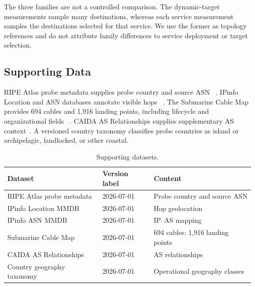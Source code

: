 The three families are not a controlled comparison. The dynamic-target
measurements sample many destinations, whereas each service measurement
samples the destinations selected for that service. We use the former as
topology references and do not attribute family differences to service
deployment or target selection.

\subsection{Supporting Data}

RIPE Atlas probe metadata supplies probe country and source ASN
~\cite{ripe_atlas}. IPinfo Location and ASN databases annotate visible hops
~\cite{ipinfo}. The Submarine Cable Map provides 694 cables and 1,916 landing
points, including lifecycle and organizational fields
~\cite{telegeography_submarine_map}. CAIDA AS Relationships supplies
supplementary AS context~\cite{caida_as_relationships}. A versioned country
taxonomy classifies probe countries as island or archipelagic, landlocked, or
other coastal.

\begin{table}[t]
  \centering
  \caption{Supporting datasets.}
  \label{tab:supporting_datasets}
  \footnotesize
  \begin{tabular}{p{}p{}p{}}
    \toprule
    Dataset & Version label & Content \\
    \midrule
    RIPE Atlas probe metadata & 2026-07-01 & Probe country and source ASN \\
    IPinfo Location MMDB & 2026-07-01 & Hop geolocation \\
    IPinfo ASN MMDB & 2026-07-01 & IP--AS mapping \\
    Submarine Cable Map & 2026-07-01 & 694 cables; 1,916 landing points \\
    CAIDA AS Relationships & 2026-07-01 & AS relationships \\
    Country geography taxonomy & 2026-07-01 & Operational geography classes \\
    \bottomrule
  \end{tabular}
\end{table}
